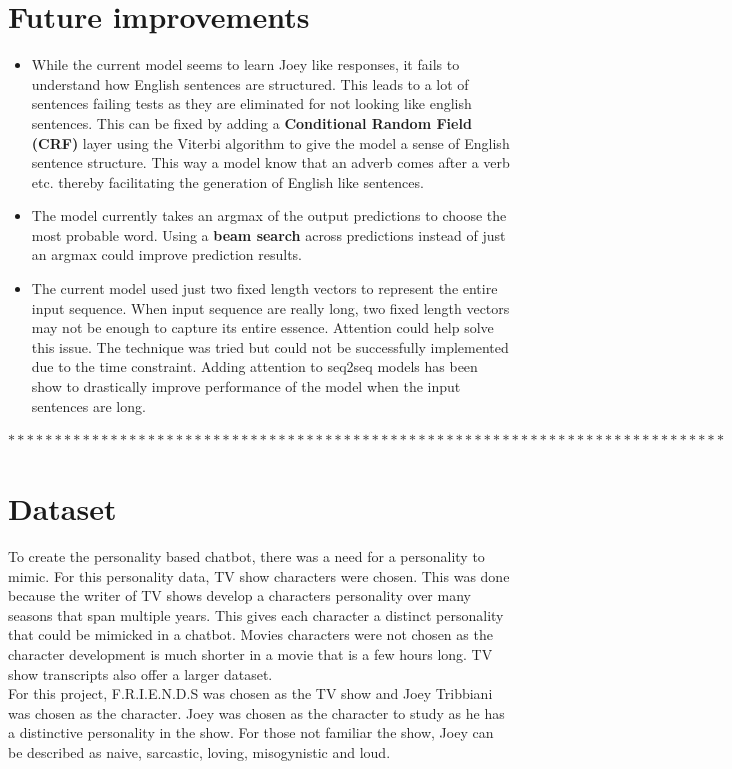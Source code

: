 \documentclass[12pt]{article}
\begin{document}
\section*{Future improvements}
\begin{itemize}
    \item While the current model seems to learn Joey like responses, it fails to understand how English sentences are structured. This leads to a lot of sentences failing tests as they are eliminated for not looking like english sentences. This can be fixed by adding a \textbf{Conditional Random Field (CRF)} layer using the Viterbi algorithm to give the model a sense of English sentence structure. This way a model know that an adverb comes after a verb etc. thereby facilitating the generation of English like sentences.
    \item The model currently takes an argmax of the output predictions to choose the most probable word. Using a \textbf{beam search} across predictions instead of just an argmax could improve prediction results.
    
    \item The current model used just two fixed length vectors to represent the entire input sequence. When input sequence are really long, two fixed length vectors may not be enough to capture its entire essence. Attention could help solve this issue. The technique was tried but could not be successfully implemented due to the time constraint. Adding attention to seq2seq models has been show to drastically improve performance of the model when the input sentences are long.
\end{itemize}


$*****************************************************************************$
\section*{Dataset}
To create the personality based chatbot, there was a need for a personality to mimic. For this personality data, TV show characters were chosen. This was done because the writer of TV shows develop a characters personality over many seasons that span multiple years. This gives each character a distinct personality that could be mimicked in a chatbot. Movies characters were not chosen as the character development is much shorter in a movie that is a few hours long. TV show transcripts also offer a larger dataset.\\

For this project, F.R.I.E.N.D.S was chosen as the TV show and Joey Tribbiani was chosen as the character. Joey was chosen as the character to study as he has a distinctive personality in the show. For those not familiar the show, Joey can be described as naive, sarcastic, loving, misogynistic and loud. \\
\end{document}
